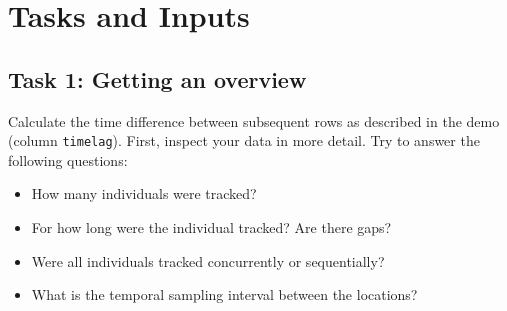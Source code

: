 \documentclass[]{book}
\newenvironment{Shaded}{\begin{snugshade}}{\end{snugshade}}
\newcommand{\KeywordTok}[1]{\textcolor[rgb]{0.13,0.29,0.53}{\textbf{#1}}}
\newcommand{\DataTypeTok}[1]{\textcolor[rgb]{0.13,0.29,0.53}{#1}}
\newcommand{\StringTok}[1]{\textcolor[rgb]{0.31,0.60,0.02}{#1}}
\newcommand{\OperatorTok}[1]{\textcolor[rgb]{0.81,0.36,0.00}{\textbf{#1}}}
\newcommand{\NormalTok}[1]{#1}
\providecommand{\tightlist}{%
  \setlength{\itemsep}{0pt}\setlength{\parskip}{0pt}}
\begin{document}
\begin{Shaded}
\end{Shaded}

\section{Tasks and Inputs}\label{tasks-and-inputs-1}

\subsection{Task 1: Getting an
overview}\label{task-1-getting-an-overview}

Calculate the time difference between subsequent rows as described in
the demo (column \texttt{timelag}). First, inspect your data in more
detail. Try to answer the following questions:

\begin{itemize}
\tightlist
\item
  How many individuals were tracked?
\item
  For how long were the individual tracked? Are there gaps?
\item
  Were all individuals tracked concurrently or sequentially?
\item
  What is the temporal sampling interval between the locations?
\end{itemize}
\end{document}
